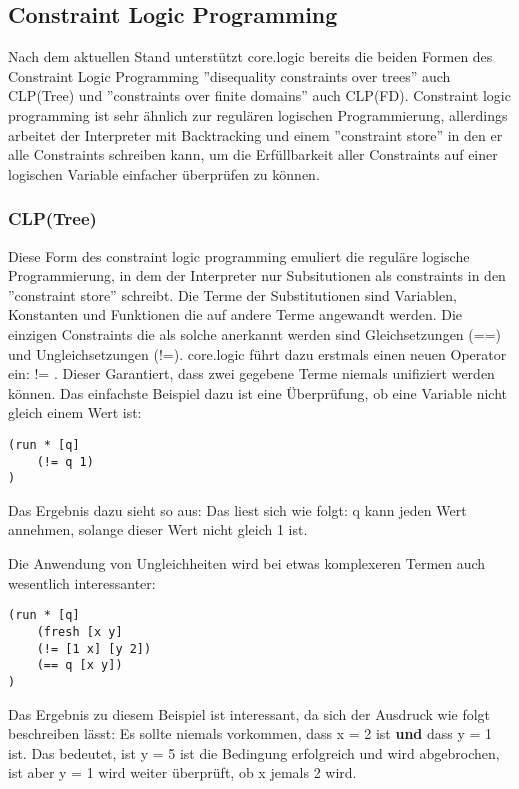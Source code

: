 \subsection{Constraint Logic Programming}
Nach dem aktuellen Stand unterstützt core.logic bereits die beiden Formen des Constraint Logic Programming ''disequality constraints over trees'' auch CLP(Tree) und ''constraints over finite domains'' auch CLP(FD).
Constraint logic programming ist sehr ähnlich zur regulären logischen Programmierung, allerdings arbeitet der Interpreter mit Backtracking und einem ''constraint store'' in den er alle Constraints schreiben kann, um die Erfüllbarkeit aller Constraints auf einer logischen Variable einfacher überprüfen zu können.

\subsubsection{CLP(Tree)}
Diese Form des constraint logic programming emuliert die reguläre logische Programmierung, in dem der Interpreter nur Subsitutionen als constraints in den ''constraint store'' schreibt. 
Die Terme der Substitutionen sind Variablen, Konstanten und Funktionen die auf andere Terme angewandt werden. 
Die einzigen Constraints die als solche anerkannt werden sind Gleichsetzungen (==) und Ungleichsetzungen (!=).
core.logic führt dazu erstmals einen neuen Operator ein: != . Dieser Garantiert, dass zwei gegebene Terme niemals unifiziert werden können.
Das einfachste Beispiel dazu ist eine Überprüfung, ob eine Variable nicht gleich einem Wert ist:
\begin{lstlisting}
(run * [q]
	(!= q 1)
)
\end{lstlisting}
Das Ergebnis dazu sieht so aus:  Das liest sich wie folgt: q kann jeden Wert annehmen, solange dieser Wert nicht gleich 1 ist.

Die Anwendung von Ungleichheiten wird bei etwas komplexeren Termen auch wesentlich interessanter:
\begin{lstlisting}
(run * [q]
	(fresh [x y]
	(!= [1 x] [y 2])
	(== q [x y])
)
\end{lstlisting}
Das Ergebnis zu diesem Beispiel ist interessant, da sich der Ausdruck wie folgt beschreiben lässt: Es sollte niemals vorkommen, dass x = 2 ist \textbf{und} dass y = 1 ist. Das bedeutet, ist y = 5 ist die Bedingung erfolgreich und wird abgebrochen, ist aber y = 1 wird weiter überprüft, ob x jemals 2 wird.


